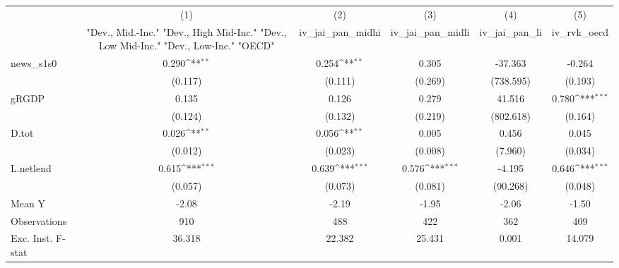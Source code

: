 {
\def\sym#1{\ifmmode^{#1}\else\(^{#1}\)\fi}
\begin{tabular}{l*{5}{c}}
\toprule
            &\multicolumn{1}{c}{(1)}&\multicolumn{1}{c}{(2)}&\multicolumn{1}{c}{(3)}&\multicolumn{1}{c}{(4)}&\multicolumn{1}{c}{(5)}\\
            &\multicolumn{1}{c}{ "Dev., Mid.-Inc." "Dev., High Mid-Inc." "Dev., Low Mid-Inc." "Dev., Low-Inc." "OECD" }&\multicolumn{1}{c}{iv\_jai\_pan\_midhi}&\multicolumn{1}{c}{iv\_jai\_pan\_midli}&\multicolumn{1}{c}{iv\_jai\_pan\_li}&\multicolumn{1}{c}{iv\_rvk\_oecd}\\
\midrule
news\_s1s0   &       0.290\sym{**} &       0.254\sym{**} &       0.305         &     -37.363         &      -0.264         \\
            &     (0.117)         &     (0.111)         &     (0.269)         &   (738.595)         &     (0.193)         \\
\addlinespace
gRGDP       &       0.135         &       0.126         &       0.279         &      41.516         &       0.780\sym{***}\\
            &     (0.124)         &     (0.132)         &     (0.219)         &   (802.618)         &     (0.164)         \\
\addlinespace
D.tot       &       0.026\sym{**} &       0.056\sym{**} &       0.005         &       0.456         &       0.045         \\
            &     (0.012)         &     (0.023)         &     (0.008)         &     (7.960)         &     (0.034)         \\
\addlinespace
L.netlend   &       0.615\sym{***}&       0.639\sym{***}&       0.576\sym{***}&      -4.195         &       0.646\sym{***}\\
            &     (0.057)         &     (0.073)         &     (0.081)         &    (90.268)         &     (0.048)         \\
\midrule
Mean Y      &       -2.08         &       -2.19         &       -1.95         &       -2.06         &       -1.50         \\
Observations&         910         &         488         &         422         &         362         &         409         \\
Exc. Inst. F-stat&      36.318         &      22.382         &      25.431         &       0.001         &      14.079         \\
\bottomrule
\end{tabular}
}
